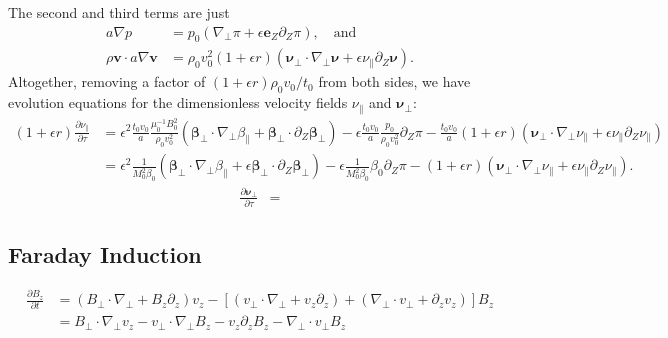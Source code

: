 \documentclass{article}
\newcommand{\para}{\parallel}
\newcommand{\ep}{\epsilon}
\newcommand{\np}{\nabla_\perp}
\newcommand{\p}{\partial}
\newcommand{\deriv}[2]{\frac{\p #1}{\p #2}}
\newcommand{\pth} [1] {\left( #1 \right) }
\newcommand{\br} [1] {\left[ #1 \right] }
\begin{document}
The second and third terms are just   
\begin{align*}
    a\nabla p &= p_0\pth{\np\pi + \ep\bm{e}_Z\p_Z\pi}, \quad\text{and} \\ 
    \rho\bm{v}\cdot a\nabla\bm{v} &= \rho_0v_0^2 \pth{1+\ep r} \pth{\bm{\nu}_\perp\cdot\np\bm{\nu} + \ep\nu_\para\p_Z\bm{\nu}}. 
\end{align*}
Altogether, removing a factor of $\pth{1+\ep r} \rho_0v_0/t_0$ from both sides, we have evolution equations for the dimensionless velocity fields $\nu_\para$ and $\bm{\nu}_\perp$:  
\begin{align*}
    \pth{1+\ep r} \deriv{\nu_\para}{\tau} &= \ep^2 \frac{t_0v_0}{a} \frac{\mu_0^{-1} B_0^2}{\rho_0v_0^2} \pth{\bm{\beta}_\perp\cdot\np\beta_\para + \bm{\beta}_\perp\cdot\p_Z\bm{\beta}_\perp} - \ep\frac{t_0v_0}{a}\frac{p_0}{\rho_0v_0^2} \p_Z\pi - \frac{t_0v_0}{a} \pth{1+\ep r} \pth{\bm{\nu}_\perp \cdot \np\nu_\para + \ep \nu_\para\p_Z\nu_\para} \\ 
    &= \ep^2\frac{1}{M_0^2\beta_0} \pth{\bm{\beta}_\perp\cdot\np\beta_\para + \ep\bm{\beta}_\perp\cdot\p_Z\bm{\beta}_\perp} - \ep \frac{1}{M_0^2\beta_0} \beta_0\p_Z\pi - \pth{1+\ep r} \pth{\bm{\nu}_\perp\cdot\np\nu_\para + \ep \nu_\para\p_Z\nu_\para}. 
\end{align*}
\begin{align*}
    \deriv{\bm{\nu}_\perp}{\tau} &= 
\end{align*}


\subsection{Faraday Induction}
\begin{align*} 
\deriv{B_z}{t} &= 
    \pth{B_\perp\cdot\np + B_z\p_z}v_z - \br{(v_\perp\cdot\np + v_z\p_z) + (\np\cdot v_\perp + \p_zv_z)} B_z \\
    &= B_\perp\cdot\np v_z - v_\perp\cdot\np B_z - v_z\p_zB_z - \np \cdot v_\perp B_z 
\end{align*}
\end{document}

